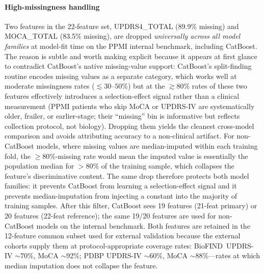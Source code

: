 \documentclass[10pt,letterpaper]{article}
\begin{document}
\paragraph*{High-missingness handling} Two features in the 22-feature set, UPDRS4\_TOTAL (89.9\% missing) and MOCA\_TOTAL (83.5\% missing), are dropped \emph{universally across all model families} at model-fit time on the PPMI internal benchmark, including CatBoost. The reason is subtle and worth making explicit because it appears at first glance to contradict CatBoost's native missing-value support: CatBoost's split-finding routine encodes missing values as a separate category, which works well at moderate missingness rates ($\lesssim 30$--$50$\%) but at the $\gtrsim 80$\% rates of these two features effectively introduces a selection-effect signal rather than a clinical measurement (PPMI patients who skip MoCA or UPDRS-IV are systematically older, frailer, or earlier-stage; their ``missing'' bin is informative but reflects collection protocol, not biology). Dropping them yields the cleanest cross-model comparison and avoids attributing accuracy to a non-clinical artifact. For non-CatBoost models, where missing values are median-imputed within each training fold, the $\geq 80$\%-missing rate would mean the imputed value is essentially the population median for ${>}80$\% of the training sample, which collapses the feature's discriminative content. The same drop therefore protects both model families: it prevents CatBoost from learning a selection-effect signal and it prevents median-imputation from injecting a constant into the majority of training samples. After this filter, CatBoost sees 19 features (21-feat primary) or 20 features (22-feat reference); the same 19/20 features are used for non-CatBoost models on the internal benchmark. Both features are retained in the 12-feature common subset used for external validation because the external cohorts supply them at protocol-appropriate coverage rates: BioFIND~UPDRS-IV $\sim$70\%, MoCA $\sim$92\%; PDBP UPDRS-IV $\sim$60\%, MoCA $\sim$88\%---rates at which median imputation does not collapse the feature.
\end{document}
